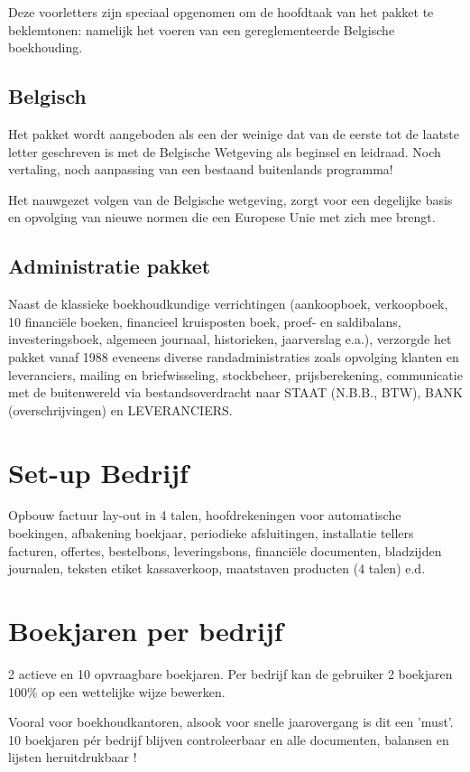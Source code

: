 \documentclass[12pt]{report} %
\begin{document}
Deze voorletters zijn speciaal opgenomen om de hoofdtaak van het pakket te
beklemtonen: namelijk het voeren van een gereglementeerde Belgische boekhouding.

\subsection{Belgisch}
Het pakket wordt aangeboden als een der weinige dat van de eerste tot de laatste
letter geschreven is met de Belgische Wetgeving als beginsel en leidraad.
Noch vertaling, noch aanpassing van een bestaand buitenlands programma!

Het nauwgezet volgen van de Belgische wetgeving, zorgt voor een degelijke basis
en opvolging van nieuwe normen die een Europese Unie met zich mee brengt.

\subsection{Administratie pakket}
Naast de klassieke boekhoudkundige verrichtingen (aankoopboek, verkoopboek,
10 financiële boeken, financieel kruisposten boek, proef- en saldibalans,
investeringsboek, algemeen journaal, historieken, jaarverslag e.a.), verzorgde het
pakket vanaf 1988 eveneens diverse randadministraties zoals opvolging klanten en
leveranciers, mailing en briefwisseling, stockbeheer, prijsberekening, communicatie
met de buitenwereld via bestandsoverdracht naar STAAT (N.B.B., BTW),
BANK (overschrijvingen) en LEVERANCIERS.

\section{Set-up Bedrijf}
Opbouw factuur lay-out in 4 talen, hoofdrekeningen voor automatische boekingen,
afbakening boekjaar, periodieke afsluitingen, installatie tellers facturen, offertes,
bestelbons, leveringsbons, financiële documenten, bladzijden journalen, teksten
etiket kassaverkoop, maatstaven producten (4 talen) e.d.

\section{Boekjaren per bedrijf}
2 actieve en 10 opvraagbare boekjaren.
Per bedrijf kan de gebruiker 2 boekjaren 100\% op een wettelijke wijze bewerken.

Vooral voor boekhoudkantoren, alsook voor snelle jaarovergang is dit een 'must'.
10 boekjaren pér bedrijf blijven controleerbaar en alle documenten, balansen en
lijsten heruitdrukbaar !
\end{document}
